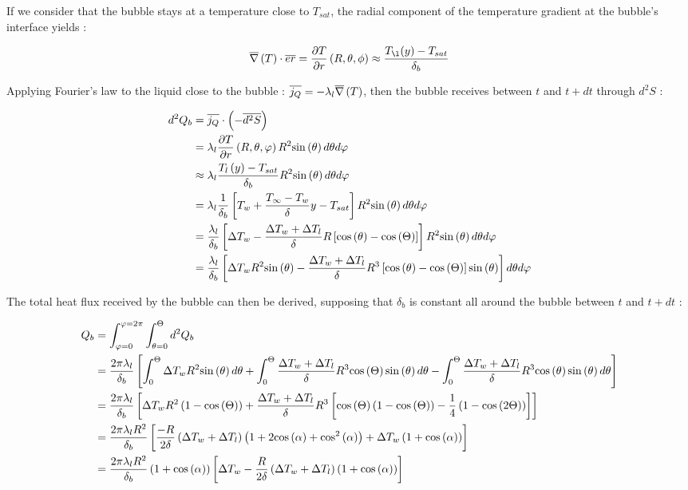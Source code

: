If we consider that the bubble stays at a temperature close to $T_{sat}$, the radial component of the temperature gradient at the bubble's interface yields :

\begin{align}
\grad{T} \cdot \vect{er} = \dpartial{T}{r}\left(R, \theta, \phi\right)\approx\frac{T_{\l}(y)-T_{sat}}{\delta_{b}}
\end{align}

\npar



Applying Fourier's law to the liquid close to the bubble : $\overline{j_{Q}}=-\lambda_{l} \overline{\nabla}\left({T}\right)$, then the bubble receives between $t$ and $t+dt$ through $d^{2}S$ :

\begin{align}
d^{2}Q_{b}&=\overline{j_{Q}} \cdot \left(-\overline{d^{2}S}\right)\\
&=\lambda_{l} \frac{\partial T}{\partial r}\left(R,\theta, \varphi\right) R^{2}\mathrm{sin}\left( \theta \right) d\theta d\varphi\\
&\approx\lambda_{l} \frac{T_{l}\left(y\right)-T_{sat}}{\delta_{b}}R^{2}\mathrm{sin}\left( \theta \right)d\theta d\varphi\\
&=\lambda_{l} \frac{1}{\delta_{b}}\left[T_{w}+\frac{T_{\infty}-T_{w}}{\delta}y - T_{sat}\right]R^{2}\mathrm{sin}\left( \theta \right)d\theta d\varphi\\
&=\frac{\lambda_{l}}{\delta_{b}}\left[\Delta T_{w}-\frac{\Delta T_{w} + \Delta T_{l}}{\delta}R\left[\mathrm{cos}\left( \theta \right) - \mathrm{cos}\left( \Theta \right)\right]\right]R^{2}\mathrm{sin}\left( \theta \right)d\theta d\varphi\\
&=\frac{\lambda_{l}}{\delta_{b}}\left[\Delta T_{w}R^{2}\mathrm{sin}\left( \theta \right)-\frac{\Delta T_{w}+\Delta T_{l}}{\delta}R^{3}\left[\mathrm{cos}\left( \theta \right)-\mathrm{cos}\left( \Theta \right)\right]\mathrm{sin}\left( \theta \right)\right] d\theta d\varphi
\end{align}

\npar
The total heat flux received by the bubble can then be derived, supposing that $\delta_{b}$ is constant all around the bubble between $t$ and $t+dt$ :

\begin{align}
Q_{b}&=\int_{\varphi=0}^{\varphi=2\pi} \int_{\theta=0}^{\Theta}{d^{2}Q_{b}}\\
&= \frac{2\pi \lambda_{l}}{\delta_{b}}\left[\int_{0}^{\Theta} \Delta T_{w} R^{2} \mathrm{sin}\left( \theta \right)d\theta + \int_{0}^{\Theta} \frac{\Delta T_{w} + \Delta T_{l}}{\delta} R^{3} \mathrm{cos}\left( \Theta \right)\mathrm{sin}\left( \theta \right)d\theta - \int_{0}^{\Theta} \frac{\Delta T_{w} + \Delta T_{l}}{\delta} R^{3} \mathrm{cos}\left( \theta \right)\mathrm{sin}\left( \theta \right)d\theta\right]\\
&=\frac{2\pi \lambda_{l}}{\delta_{b}} \left[\Delta T_{w} R^{2} \left(1-\mathrm{cos}\left( \Theta \right)\right) + \frac{\Delta T_{w} + \Delta T_{l}}{\delta}R^{3}\left[\mathrm{cos}\left( \Theta \right)\left(1-\mathrm{cos}\left( \Theta \right)\right)- \frac{1}{4}\left(1 - \mathrm{cos}\left( 2\Theta \right)\right)\right]\right]\\
&=\frac{2\pi \lambda_{l} R^{2}}{\delta_{b}}\left[\frac{-R}{2\delta}\left(\Delta T_{w} + \Delta T_{l}\right)\left(1 + 2\mathrm{cos}\left( \alpha \right) + \mathrm{cos}^{2}\left( \alpha \right)\right) + \Delta T_{w} \left(1 + \mathrm{cos}\left( \alpha  \right) \right) \right]\\
&=\frac{2\pi \lambda_{l} R^{2}}{\delta_{b}}\left(1+\mathrm{cos}\left( \alpha \right)\right)\left[\Delta T_{w} - \frac{R}{2\delta}\left(\Delta T_{w} + \Delta T_{l}\right) \left(1 + \mathrm{cos}\left( \alpha \right) \right )\right]
\end{align}


